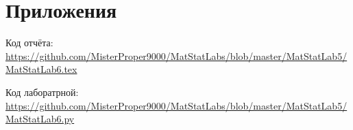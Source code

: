 \documentclass[a4]{article}
\begin{document}
\section{Приложения}


Код отчёта:\; \url{https://github.com/MisterProper9000/MatStatLabs/blob/master/MatStatLab5/MatStatLab6.tex}

Код лаборатрной:\; \url{https://github.com/MisterProper9000/MatStatLabs/blob/master/MatStatLab5/MatStatLab6.py}


\end{document}
